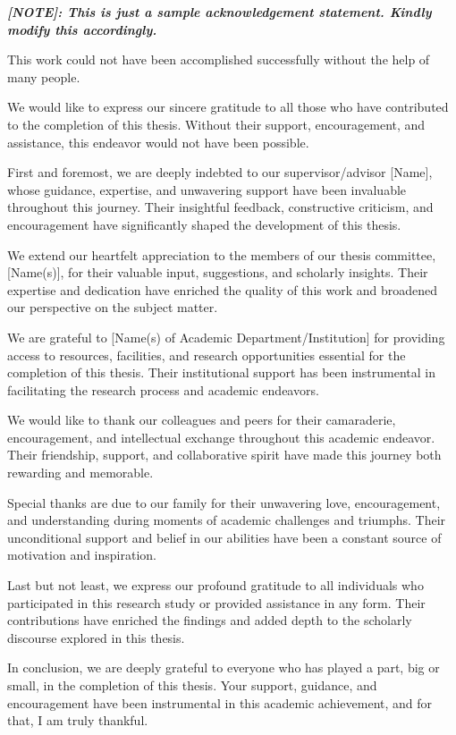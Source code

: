 \documentclass[a4paper, twoside]{report}
\begin{document}
\textbf{\textit{[NOTE]: This is just a sample acknowledgement statement. Kindly modify this accordingly.}}

This work could not have been accomplished successfully without the help of many people.

We would like to express our sincere gratitude to all those who have contributed to the completion of this thesis. Without their support, encouragement, and assistance, this endeavor would not have been possible.

First and foremost, we are deeply indebted to our supervisor/advisor [Name], whose guidance, expertise, and unwavering support have been invaluable throughout this journey. Their insightful feedback, constructive criticism, and encouragement have significantly shaped the development of this thesis.

We extend our heartfelt appreciation to the members of our thesis committee, [Name(s)], for their valuable input, suggestions, and scholarly insights. Their expertise and dedication have enriched the quality of this work and broadened our perspective on the subject matter.

We are grateful to [Name(s) of Academic Department/Institution] for providing access to resources, facilities, and research opportunities essential for the completion of this thesis. Their institutional support has been instrumental in facilitating the research process and academic endeavors.

We would like to thank our colleagues and peers for their camaraderie, encouragement, and intellectual exchange throughout this academic endeavor. Their friendship, support, and collaborative spirit have made this journey both rewarding and memorable.

Special thanks are due to our family for their unwavering love, encouragement, and understanding during moments of academic challenges and triumphs. Their unconditional support and belief in our abilities have been a constant source of motivation and inspiration.

Last but not least, we express our profound gratitude to all individuals who participated in this research study or provided assistance in any form. Their contributions have enriched the findings and added depth to the scholarly discourse explored in this thesis.

In conclusion, we are deeply grateful to everyone who has played a part, big or small, in the completion of this thesis. Your support, guidance, and encouragement have been instrumental in this academic achievement, and for that, I am truly thankful.
\end{document}
